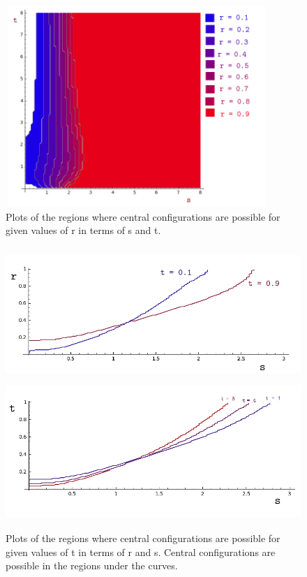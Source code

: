 \documentclass[11pt,leqno]{article}
\theoremstyle{definition}
\theoremstyle{remark}
\numberwithin{equation}{section}
\begin{document}
\begin{center}

\begin{figure}
\includegraphics[width=3.9in, height=3in]{regionsRfixed.png}
 \caption{ \label{EL}  Plots of the regions where central configurations are possible for given values of r in terms of s and t.} 
\end{figure}

\begin{figure}
\includegraphics[width=6in, height=2in]{regionstLessThan1.png}
\includegraphics[width=6in, height=2in]{regionst18.png}
 \caption{ \label{EL}  Plots of the regions where central configurations are possible for given values of t in terms of r and s. Central configurations are possible in the regions under the curves.} 
\end{figure}

\end{center}
\end{document}
